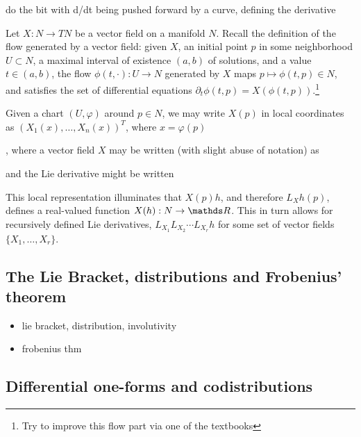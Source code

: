 {\color{red}do the bit with d/dt being pushed forward by a curve, defining the derivative

Let $X: N \rightarrow TN$ be a vector field on a manifold $N$. Recall the definition of the flow
generated by a vector field: given $X$, an initial point $p$ in some neighborhood $U\subset N$, a maximal interval of existence $(a, b)$ of solutions, and a value $t\in (a,b)$, the flow $\phi(t, \cdot): U \rightarrow N$ generated by $X$ maps $p \mapsto \phi(t, p)\in N$, and satisfies the set of differential equations $\partial_t\phi(t, p) = X(\phi(t, p))$.\footnote{{\color{red} Try to improve this flow part via one of the textbooks}}

Given a chart $(U, \varphi)$ around $p\in N$, we may write $X(p)$ in local coordinates as $(X_1(x), \dots, X_n(x))^T$, where $x = \varphi(p)$



, where a vector field $X$ may be written (with slight abuse of notation) as

 and the Lie derivative might be written 


This local representation illuminates that $X(p)h$, and therefore $L_Xh(p)$, defines a real-valued function $X(h):N\rightarrow \R$. This in turn allows for recursively defined Lie derivatives, $L_{X_{1}}L_{X_{2}}\cdots L_{X_{r}}h$ for some set of vector fields $\{X_1, \dots , X_r\}$.


}

\subsection{The Lie Bracket, distributions and Frobenius' theorem}\label{sec:prelim-frobenius}

{\color{blue}
\begin{itemize}
    \item lie bracket, distribution, involutivity
    \item frobenius thm
\end{itemize}

}



\subsection{Differential one-forms and codistributions}\label{sec:1FandCodistrib}
